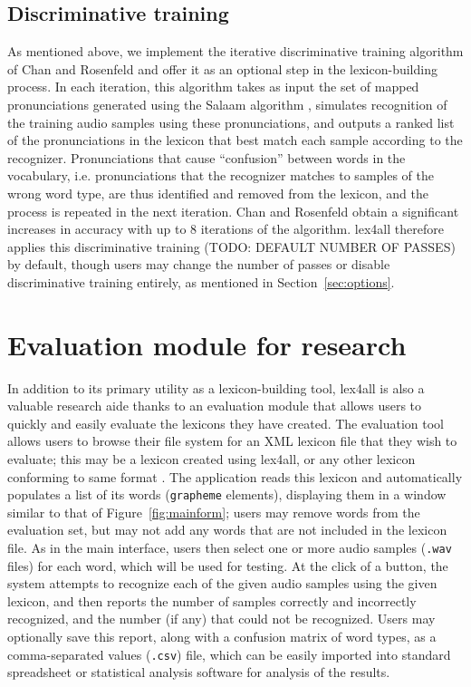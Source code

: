 \documentclass[11pt]{article}
\begin{document}
\subsection{Discriminative training}
\label{sec:discrimtrain}
As mentioned above, we implement the iterative discriminative training algorithm of Chan and Rosenfeld  and offer it as an optional step in the lexicon-building process. In each iteration, this algorithm takes as input the set of mapped pronunciations generated using the Salaam algorithm \cite{Qiao10}, simulates recognition of the training audio samples using these pronunciations, and outputs a ranked list of the pronunciations in the lexicon that best match each sample according to the recognizer. Pronunciations that cause ``confusion'' between words in the vocabulary, i.e. pronunciations that the recognizer matches to samples of the wrong word type, are thus identified and removed from the lexicon, and the process is repeated in the next iteration. Chan and Rosenfeld  obtain a significant increases in accuracy with up to 8 iterations of the algorithm. lex4all therefore applies this discriminative training (TODO: DEFAULT NUMBER OF PASSES) by default, though users may change the number of passes or disable discriminative training entirely, as mentioned in Section~\ref{sec:options}.


\section{Evaluation module for research}
\label{sec:evaluation}

In addition to its primary utility as a lexicon-building tool, lex4all is also a valuable research aide thanks to an evaluation module that allows users to quickly and easily evaluate the lexicons they have created. The evaluation tool allows users to browse their file system for an XML lexicon file that they wish to evaluate; this may be a lexicon created using lex4all, or any other lexicon conforming to same format \cite{pls}. The application reads this lexicon and automatically populates a list of its words (\texttt{grapheme} elements), displaying them in a window similar to that of Figure~\ref{fig:mainform}; users may remove words from the evaluation set, but may not add any words that are not included in the lexicon file. As in the main interface, users then select one or more audio samples (\texttt{.wav} files) for each word, which will be used for testing. At the click of a button, the system attempts to recognize each of the given audio samples using the given lexicon, and then reports the number of samples correctly and incorrectly recognized, and the number (if any) that could not be recognized. Users may optionally save this report, along with a confusion matrix of word types, as a comma-separated values (\texttt{.csv}) file, which can be easily imported into standard spreadsheet or statistical analysis software for analysis of the results. 
\end{document}
